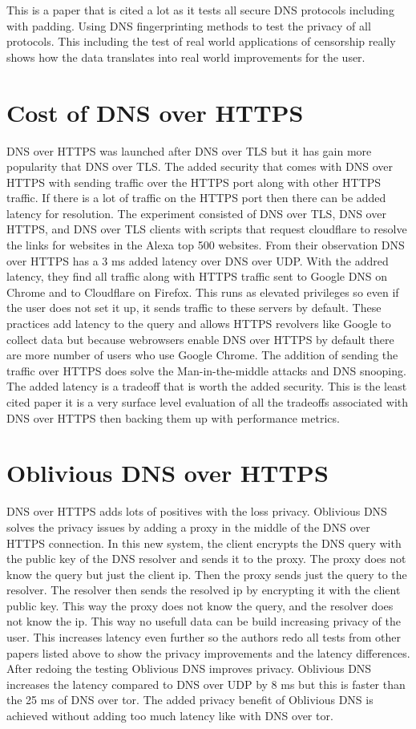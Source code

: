 \documentclass[10pt,conference]{IEEEtran}
\begin{document}
This is a paper that is cited a lot as it tests all secure DNS protocols including with padding. Using DNS fingerprinting methods to test the privacy of all protocols. This including the test of real world applications of censorship really shows how the data translates into real world improvements for the user. 

\section{Cost of DNS over HTTPS \cite{bottger2019empirical}}
DNS over HTTPS was launched after DNS over TLS but it has gain more popularity that DNS over TLS. The added security that comes with DNS over HTTPS with sending traffic over the HTTPS port along with other HTTPS traffic. If there is a lot of traffic on the HTTPS port then there can be added latency for resolution. The experiment consisted of DNS over TLS, DNS over HTTPS, and DNS over TLS clients with scripts that request cloudflare to resolve the links for websites in the Alexa top 500 websites. From their observation DNS over HTTPS has a 3 ms added latency over DNS over UDP. With the addred latency, they find all traffic along with HTTPS traffic sent to Google DNS on Chrome and to Cloudflare on Firefox. This runs as elevated privileges so even if the user does not set it up, it sends traffic to these servers by default. These practices add latency to the query and allows HTTPS revolvers like Google to collect data but because webrowsers enable DNS over HTTPS by default there are more number of users who use Google Chrome. The addition of sending the traffic over HTTPS does solve the Man-in-the-middle attacks and DNS snooping. The added latency is a tradeoff that is worth the added security. This is the least cited paper it is a very surface level evaluation of all the tradeoffs associated with DNS over HTTPS then backing them up with performance metrics. 

\section{Oblivious DNS over HTTPS \cite{singanamalla2020oblivious}}
DNS over HTTPS adds lots of positives with the loss privacy. Oblivious DNS solves the privacy issues by adding a proxy in the middle of the DNS over HTTPS connection. In this new system, the client encrypts the DNS query with the public key of the DNS resolver and sends it to the proxy. The proxy does not know the query but just the client ip. Then the proxy sends just the query to the resolver. The resolver then sends the resolved ip by encrypting it with the client public key. This way the proxy does not know the query, and the resolver does not know the ip. This way no usefull data can be build increasing privacy of the user. This increases latency even further so the authors redo all tests from other papers listed above to show the privacy improvements and the latency differences. After redoing the testing Oblivious DNS improves privacy. Oblivious DNS increases the latency compared to DNS over UDP by 8 ms but this is faster than the 25 ms of DNS over tor. The added privacy benefit of Oblivious DNS is achieved without adding too much latency like with DNS over tor. 
\end{document}
